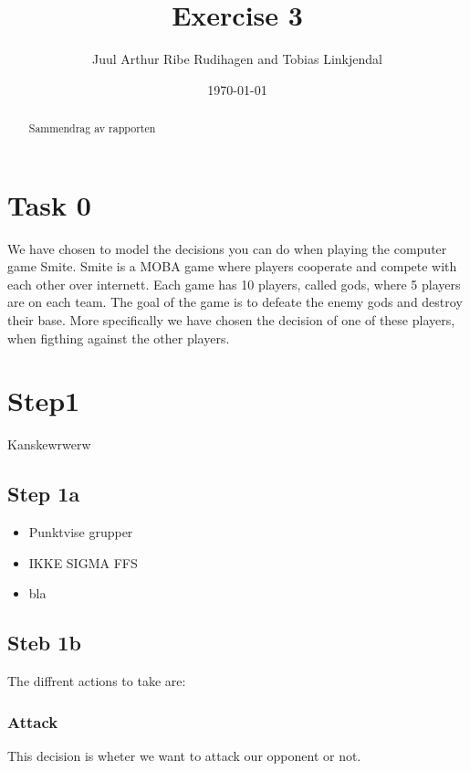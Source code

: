 \documentclass[titlepage]{article}
\author{Juul Arthur Ribe Rudihagen and Tobias Linkjendal}
\title{Exercise 3}
\date{\today}
\begin{document}
\maketitle

\renewcommand{\abstractname}{Summary}
\begin{abstract}
Sammendrag av rapporten
\end{abstract}

\tableofcontents

\newpage


\section{Task 0}
We have chosen to model the decisions you can do when playing the computer game Smite. Smite is a MOBA game where players cooperate and compete with each other over internett. Each game has 10 players, called gods, where 5 players are on each team. The goal of the game is to defeate the enemy gods and destroy their base. More specifically we have chosen the decision of one of these players, when figthing against the other players.

\newpage


\section{Step1}
Kanskewrwerw

\subsection{Step 1a}
\begin{itemize}
\item Punktvise grupper
\item IKKE SIGMA FFS%
\item bla
\end{itemize} 


\subsection{Steb 1b}
The diffrent actions to take are:
\subsubsection*{Attack}
This decision is wheter we want to attack our opponent or not.
\end{document}
